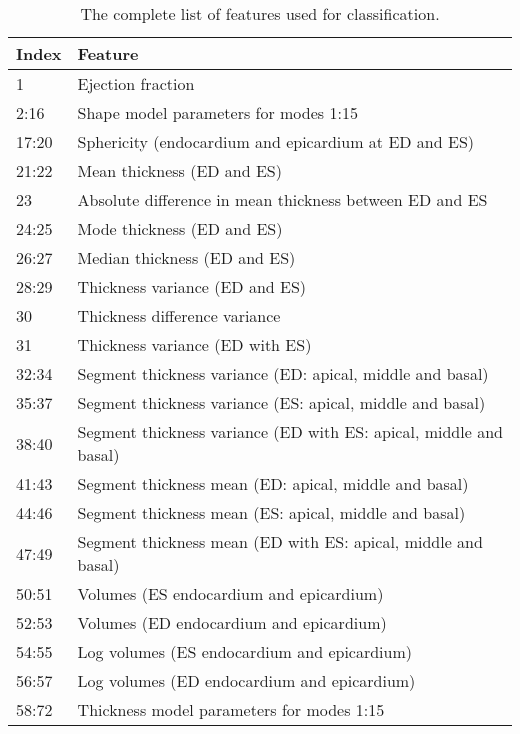\documentclass{llncs}
\begin{document}
\begin{table}

		\begin{center}
	
		\begin{tabular}{l|l|}
\textbf{Index} \space & \multicolumn{1}{l}{\textbf{Feature}}
\\
 \hline
\cline{1-2}
 1 & Ejection fraction \\
\cline{1-2}
 2:16 & Shape model parameters for modes 1:15\\
\cline{1-2}
 17:20 & Sphericity (endocardium and epicardium at ED and ES)\\
 \cline{1-2}
 21:22 & Mean thickness (ED and ES)\\
  23 & Absolute difference in mean thickness between ED and ES\\
 
  24:25 & Mode thickness (ED and ES)\\
  
  26:27 & Median thickness (ED and ES)\\
  
  28:29 & Thickness variance (ED and ES)\\
  
  30 & Thickness difference variance\\
  
  31 & Thickness variance (ED with ES)\\
   \cline{1-2}
  32:34 & Segment thickness variance (ED: apical, middle and basal)\\
   35:37 & Segment thickness variance (ES: apical, middle and basal)\\
  
  38:40 & Segment thickness variance (ED with ES: apical, middle and basal)\\
  \cline{1-2}
  41:43 & Segment thickness mean (ED: apical, middle and basal)\\
  44:46 & Segment thickness mean (ES: apical, middle and basal)\\
   47:49 & Segment thickness mean (ED with ES: apical, middle and basal)\\
   \cline{1-2}
   50:51 & Volumes (ES endocardium and epicardium) \\
   52:53 & Volumes (ED endocardium and epicardium) \\
   \cline{1-2}
    54:55 & Log volumes (ES endocardium and epicardium) \\
   56:57 & Log volumes (ED endocardium and epicardium) \\
    \cline{1-2}
    58:72 & Thickness model parameters for modes 1:15\\

     \cline{1-2}
     \end{tabular}

		\caption{The complete list of features used for classification.}
		\label{table:featurelist}
		\end{center}
		\end{table}
\end{document}
